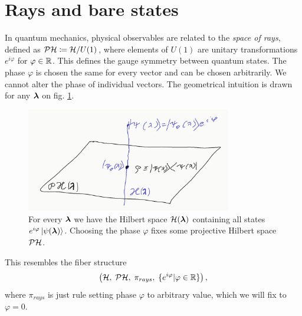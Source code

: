 \section{Rays and bare states}
In quantum mechanics, physical observables are related to the \emph{space of rays}, defined as $\mathcal{P}\mathcal{H}\coloneqq \mathcal{H}/U(1)$, where elements of $U(1)$ are unitary transformations $e^{i\varphi}$ for $\varphi\in\mathbb{R}$. This defines the gauge symmetry between quantum states. The phase $\varphi$ is chosen the same for every vector and can be chosen arbitrarily. We cannot alter the phase of individual vectors. The geometrical intuition is drawn for any ${\bm\lambda}$ on fig. \ref{fig:projectiveHilbertSpace}.
\begin{figure}[H]
    \centering
    \includegraphics[width=0.8\textwidth]{../img/projectiveHilbertSpace.png}
\caption{For every ${\bm\lambda}$ we have the Hilbert space $\mathcal{H}({\bm\lambda})$ containing all states $e^{i\varphi}\ket{\psi({\bm\lambda})}$. Choosing the phase $\varphi$ fixes some projective Hilbert space $\mathcal{P}\mathcal{H}$.}
    \label{fig:projectiveHilbertSpace}
\end{figure}

This resembles the fiber structure
$$\left(\mathcal{H},\;\mathcal{P}\mathcal{H},\;\pi_{rays},\;\{e^{i\varphi}| \varphi\in\mathbb{R}\}\right),$$
where $\pi_{rays}$ is just rule setting phase $\varphi$ to arbitrary value, which we will fix to $\varphi=0$.







